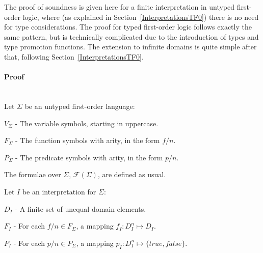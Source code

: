 \documentclass{easychair}
\newenvironment{packed_itemize}{
\vspace*{-0.2em}
\begin{itemize}
\setlength{\partopsep}{0pt}
\setlength{\itemsep}{1pt}
\setlength{\parskip}{0pt}
\setlength{\parsep}{0pt}
}{\end{itemize}}
\newcommand{\true}{{\mathit{true}}}
\newcommand{\false}{{\mathit{false}}}
\begin{document}
The proof of soundness is given here for a finite interpretation in untyped first-order logic, 
where (as explained in Section~\ref{InterpretationsTF0}) there is no need for type considerations.
The proof for typed first-order logic follows exactly the same pattern, but is technically
complicated due to the introduction of types and type promotion functions.
The extension to infinite domains is quite simple after that, following 
Section~\ref{InterpretationsTF0}.

\newpage
\paragraph{Proof}
~\\
Let $\Sigma$ be an untyped first-order language:
\begin{packed_itemize}
\item $V_\Sigma$ - The variable symbols, starting in uppercase.
\item $F_\Sigma$ - The function symbols with arity, in the form $f/n$.
\item $P_\Sigma$ - The predicate symbols with arity, in the form $p/n$.
\end{packed_itemize}
The formulae over $\Sigma$, $\mathcal{F}(\Sigma)$, are defined as usual. 

\vspace*{1em}
\noindent
Let $I$ be an interpretation for $\Sigma$:
\begin{packed_itemize}
\item $D_I$ - A finite set of unequal domain elements.
\item $F_I$ - For each $f/n \in F_\Sigma$, a mapping $f_I: D_I^n \mapsto D_I$.
\item $P_I$ - For each $p/n \in P_\Sigma$, a mapping $p_I: D_I^n \mapsto \{\true,\false\}$.
\end{packed_itemize}
\end{document}
